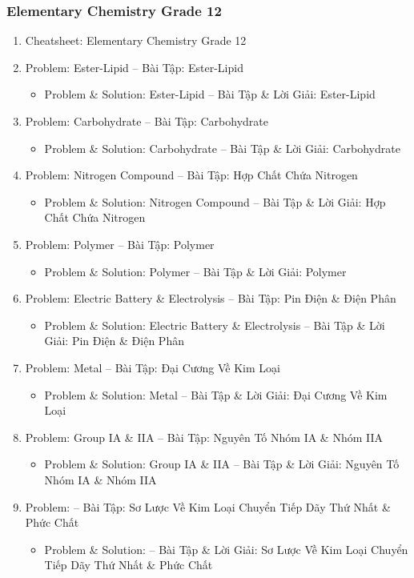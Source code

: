 \documentclass[12pt,twoside]{book}
\begin{document}
\subsubsection{Elementary Chemistry Grade 12}

\begin{enumerate}
	\item Cheatsheet: Elementary Chemistry Grade 12
	\item Problem: Ester-Lipid -- Bài Tập: Ester-Lipid
	\begin{itemize}
		\item Problem \& Solution: Ester-Lipid -- Bài Tập \& Lời Giải: Ester-Lipid
	\end{itemize}
	\item Problem: Carbohydrate -- Bài Tập: Carbohydrate
	\begin{itemize}
		\item Problem \& Solution: Carbohydrate -- Bài Tập \& Lời Giải: Carbohydrate
	\end{itemize}
	\item Problem: Nitrogen Compound -- Bài Tập: Hợp Chất Chứa Nitrogen
	\begin{itemize}
		\item Problem \& Solution: Nitrogen Compound -- Bài Tập \& Lời Giải: Hợp Chất Chứa Nitrogen
	\end{itemize}
	\item Problem: Polymer -- Bài Tập: Polymer
	\begin{itemize}
		\item Problem \& Solution: Polymer -- Bài Tập \& Lời Giải: Polymer
	\end{itemize}
	\item Problem: Electric Battery \& Electrolysis -- Bài Tập: Pin Điện \& Điện Phân
	\begin{itemize}
		\item Problem \& Solution: Electric Battery \& Electrolysis -- Bài Tập \& Lời Giải: Pin Điện \& Điện Phân
	\end{itemize}
	\item Problem: Metal -- Bài Tập: Đại Cương Về Kim Loại
	\begin{itemize}
		\item Problem \& Solution: Metal -- Bài Tập \& Lời Giải: Đại Cương Về Kim Loại
	\end{itemize}
	\item Problem: Group IA \& IIA -- Bài Tập: Nguyên Tố Nhóm IA \& Nhóm IIA
	\begin{itemize}
		\item Problem \& Solution: Group IA \& IIA -- Bài Tập \& Lời Giải: Nguyên Tố Nhóm IA \& Nhóm IIA
	\end{itemize}
	\item Problem: -- Bài Tập: Sơ Lược Về Kim Loại Chuyển Tiếp Dãy Thứ Nhất \& Phức Chất
	\begin{itemize}
		\item Problem \& Solution: -- Bài Tập \& Lời Giải: Sơ Lược Về Kim Loại Chuyển Tiếp Dãy Thứ Nhất \& Phức Chất
	\end{itemize}
\end{enumerate}
\end{document}
